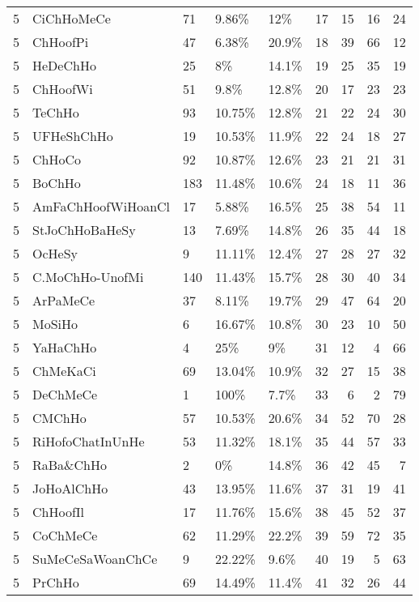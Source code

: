 \begin{longtable}{lllllrrrr}
  5 & CiChHoMeCe & 71 & 9.86\% & 12\% &  17 &  15 &  16 &  24 \\ 
  5 & ChHoofPi & 47 & 6.38\% & 20.9\% &  18 &  39 &  66 &  12 \\ 
  5 & HeDeChHo & 25 & 8\% & 14.1\% &  19 &  25 &  35 &  19 \\ 
  5 & ChHoofWi & 51 & 9.8\% & 12.8\% &  20 &  17 &  23 &  23 \\ 
  5 & TeChHo & 93 & 10.75\% & 12.8\% &  21 &  22 &  24 &  30 \\ 
  5 & UFHeShChHo & 19 & 10.53\% & 11.9\% &  22 &  24 &  18 &  27 \\ 
  5 & ChHoCo & 92 & 10.87\% & 12.6\% &  23 &  21 &  21 &  31 \\ 
  5 & BoChHo & 183 & 11.48\% & 10.6\% &  24 &  18 &  11 &  36 \\ 
  5 & AmFaChHoofWiHoanCl & 17 & 5.88\% & 16.5\% &  25 &  38 &  54 &  11 \\ 
  5 & StJoChHoBaHeSy & 13 & 7.69\% & 14.8\% &  26 &  35 &  44 &  18 \\ 
  5 & OcHeSy & 9 & 11.11\% & 12.4\% &  27 &  28 &  27 &  32 \\ 
  5 & C.MoChHo-UnofMi & 140 & 11.43\% & 15.7\% &  28 &  30 &  40 &  34 \\ 
  5 & ArPaMeCe & 37 & 8.11\% & 19.7\% &  29 &  47 &  64 &  20 \\ 
  5 & MoSiHo & 6 & 16.67\% & 10.8\% &  30 &  23 &  10 &  50 \\ 
  5 & YaHaChHo & 4 & 25\% & 9\% &  31 &  12 &   4 &  66 \\ 
  5 & ChMeKaCi & 69 & 13.04\% & 10.9\% &  32 &  27 &  15 &  38 \\ 
  5 & DeChMeCe & 1 & 100\% & 7.7\% &  33 &   6 &   2 &  79 \\ 
  5 & CMChHo & 57 & 10.53\% & 20.6\% &  34 &  52 &  70 &  28 \\ 
  5 & RiHofoChatInUnHe & 53 & 11.32\% & 18.1\% &  35 &  44 &  57 &  33 \\ 
  5 & RaBa\&ChHo & 2 & 0\% & 14.8\% &  36 &  42 &  45 &   7 \\ 
  5 & JoHoAlChHo & 43 & 13.95\% & 11.6\% &  37 &  31 &  19 &  41 \\ 
  5 & ChHoofIl & 17 & 11.76\% & 15.6\% &  38 &  45 &  52 &  37 \\ 
  5 & CoChMeCe & 62 & 11.29\% & 22.2\% &  39 &  59 &  72 &  35 \\ 
  5 & SuMeCeSaWoanChCe & 9 & 22.22\% & 9.6\% &  40 &  19 &   5 &  63 \\ 
  5 & PrChHo & 69 & 14.49\% & 11.4\% &  41 &  32 &  26 &  44 \\ 

\end{longtable}
